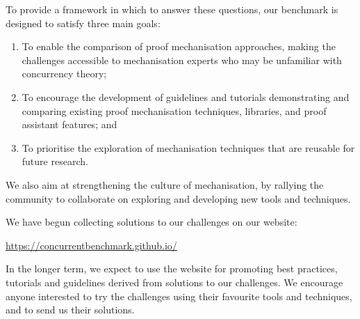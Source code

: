 \documentclass[runningheads]{llncs}
\begin{document}
To provide a framework in which to answer these questions, our benchmark is designed to satisfy three main goals:
\begin{enumerate}[label=\textbf{(G\arabic*)},leftmargin=10mm]
\item\label{item:goal-comperison-accessibility} To enable the comparison of
  proof mechanisation approaches, making the challenges accessible to
  mechanisation experts who may be unfamiliar with concurrency theory;

\item\label{item:goal-tutorials} To encourage the development of guidelines and
  tutorials demonstrating and comparing existing proof mechanisation
  techniques, libraries, and proof assistant features; and

\item\label{item:goal-reusability} To prioritise the exploration of mechanisation
  techniques that are reusable for future research.
\end{enumerate}
We also aim at strengthening the culture of mechanisation, by rallying the community to collaborate on exploring and developing new tools and techniques.

We have begun collecting solutions to our challenges on our website:
%
\begin{center}
  \url{https://concurrentbenchmark.github.io/}
\end{center}
%
In the longer term, we expect to use the website for promoting best practices, tutorials and guidelines derived from solutions to our challenges.
We encourage anyone interested to try the challenges using their favourite tools and techniques, and to send us their solutions.
\end{document}
